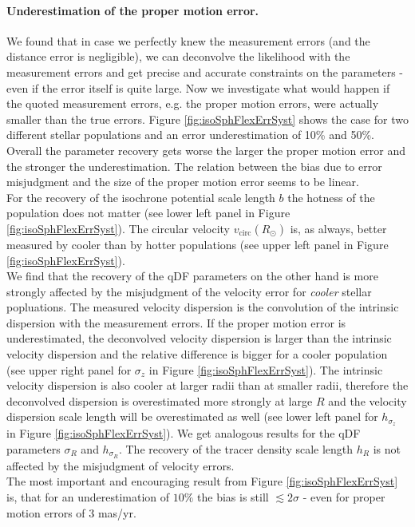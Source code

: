 \paragraph{Underestimation of the proper motion error.} We found that in case we perfectly knew the measurement errors (and the distance error is negligible), we can deconvolve the likelihood with the measurement errors and get precise and accurate constraints on the parameters - even if the error itself is quite large. Now we investigate what would happen if the quoted measurement errors, e.g. the proper motion errors, were actually smaller than the true errors. Figure \ref{fig:isoSphFlexErrSyst} shows the case for two different stellar populations and an error underestimation of 10\% and 50\%. 
\\Overall the parameter recovery gets worse the larger the proper motion error and the stronger the underestimation. The relation between the bias due to error misjudgment and the size of the proper motion error seems to be linear.
\\For the recovery of the isochrone potential scale length $b$ the hotness of the population does not matter (see lower left panel in Figure \ref{fig:isoSphFlexErrSyst}). The circular velocity $v_\text{circ}(R_\odot)$ is, as always, better measured by cooler than by hotter populations (see upper left panel in Figure \ref{fig:isoSphFlexErrSyst}). 
\\We find that the recovery of the qDF parameters on the other hand is more strongly affected by the misjudgment of the velocity error for \emph{cooler} stellar popluations. The measured velocity dispersion is the convolution of the intrinsic dispersion with the measurement errors. If the proper motion error is underestimated, the deconvolved velocity dispersion is larger than the intrinsic velocity dispersion and the relative difference is bigger for a cooler population (see upper right panel for $\sigma_z$ in Figure \ref{fig:isoSphFlexErrSyst}). The intrinsic velocity dispersion is also cooler at larger radii than at smaller radii, therefore the deconvolved dispersion is overestimated more strongly at large $R$ and the velocity dispersion scale length will be overestimated as well (see lower left panel for $h_{\sigma_z}$ in Figure \ref{fig:isoSphFlexErrSyst}). We get analogous results for the qDF parameters $\sigma_R$ and $h_{\sigma_R}$. The recovery of the tracer density scale length $h_R$ is not affected by the misjudgment of velocity errors. 
\\The most important and encouraging result from Figure \ref{fig:isoSphFlexErrSyst} is, that for an underestimation of $10\%$ the bias is still $\lesssim 2 \sigma$ - even for proper motion errors of $3$ mas/yr.


